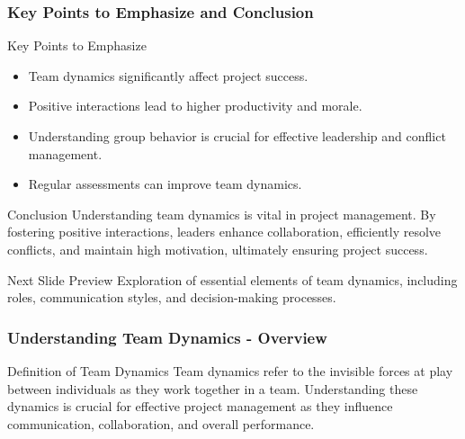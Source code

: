 \documentclass[aspectratio=169]{beamer}
\begin{document}
\begin{frame}[fragile]
    \frametitle{Key Points to Emphasize and Conclusion}
    \begin{block}{Key Points to Emphasize}
        \begin{itemize}
            \item Team dynamics significantly affect project success.
            \item Positive interactions lead to higher productivity and morale.
            \item Understanding group behavior is crucial for effective leadership and conflict management.
            \item Regular assessments can improve team dynamics.
        \end{itemize}
    \end{block}

    \begin{block}{Conclusion}
        Understanding team dynamics is vital in project management. By fostering positive interactions, leaders enhance collaboration, efficiently resolve conflicts, and maintain high motivation, ultimately ensuring project success.
    \end{block}

    \begin{block}{Next Slide Preview}
        Exploration of essential elements of team dynamics, including roles, communication styles, and decision-making processes.
    \end{block}
\end{frame}

\begin{frame}[fragile]
    \frametitle{Understanding Team Dynamics - Overview}
    \begin{block}{Definition of Team Dynamics}
        Team dynamics refer to the invisible forces at play between individuals as they work together in a team. Understanding these dynamics is crucial for effective project management as they influence communication, collaboration, and overall performance.
    \end{block}
\end{frame}
\end{document}

